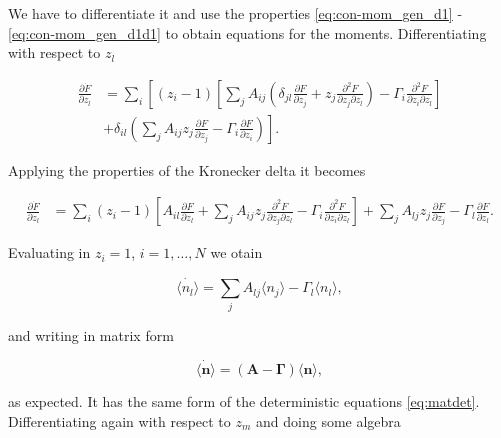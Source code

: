 We have to differentiate it and use the properties \eqref{eq:con-mom_gen_d1} - \eqref{eq:con-mom_gen_d1d1} to obtain equations for the moments. Differentiating with respect to $z_l$

\begin{equation*}
\begin{split}
\frac{\partial \dot{F}}{\partial z_l} &= \sum_i\left[(z_i-1)\left[\sum_jA_{ij}\left(\delta_{jl}\frac{\partial F}{\partial z_j}+z_j\frac{\partial^2 F}{\partial z_j\partial z_l}\right)-\Gamma_i\frac{\partial^2 F}{\partial z_i\partial z_l}\right]\right.\\
&+\left.\delta_{il}\left(\sum_jA_{ij}z_j\frac{\partial F}{\partial z_j}-\Gamma_i\frac{\partial F}{\partial z_i}\right)\right].
\end{split}
\end{equation*}

Applying the properties of the Kronecker delta it becomes

\begin{equation*}
\begin{split}
\frac{\partial \dot{F}}{\partial z_l} &= \sum_i(z_i-1)\left[A_{il}\frac{\partial F}{\partial z_l}+\sum_jA_{ij}z_j\frac{\partial^2 F}{\partial z_j\partial z_l}-\Gamma_i\frac{\partial^2 F}{\partial z_i\partial z_l}\right]+\sum_jA_{lj}z_j\frac{\partial F}{\partial z_j}-\Gamma_l\frac{\partial F}{\partial z_l}.
\end{split}
\end{equation*}

Evaluating in $z_i=1$, $i=1,\dotsc,N$ we otain

\begin{equation*}
\dot{\langle n_l \rangle} = \sum_jA_{lj}\langle n_j\rangle-\Gamma_l\langle n_l\rangle,
\end{equation*}

and writing in matrix form

\begin{equation}
  \label{eq:mas-general_ave}
  \dot{\langle \mathbf{n}\rangle} = (\mathbf{A}-\mathbf{\Gamma})\langle \mathbf{n}\rangle,
\end{equation}

as expected. It has the same form of the deterministic equations \eqref{eq:matdet}. Differentiating again with respect to $z_m$ and doing some algebra

